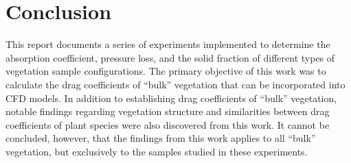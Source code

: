 \documentclass[12pt]{article}
\begin{document}




\pagebreak

\section*{Conclusion}
This report documents a series of experiments implemented to determine the absorption coefficient, pressure loss, and the solid fraction of different types of vegetation sample configurations. The primary objective of this work was to calculate the drag coefficients of ``bulk'' vegetation that can be incorporated into CFD models. In addition to establishing drag coefficients of ``bulk''  vegetation, notable findings regarding vegetation structure and similarities between drag coefficients of plant species were also discovered from this work. It cannot be concluded, however, that the findings from this work applies to all ``bulk'' vegetation, but exclusively to the samples studied in these experiments. 
\end{document}

